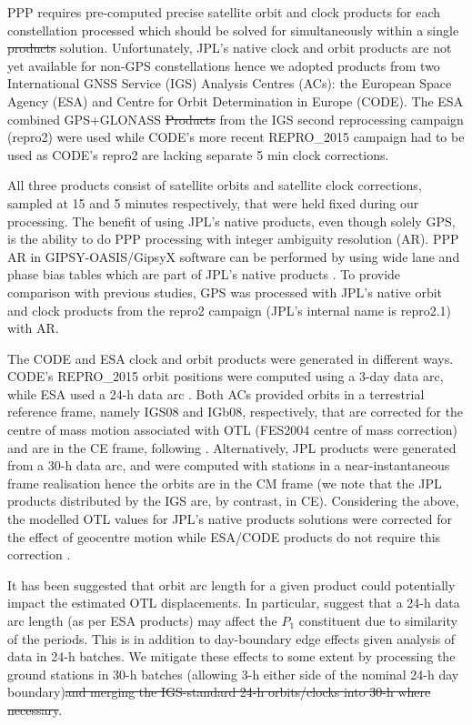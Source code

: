 \documentclass[se, manuscript]{copernicus}
\providecommand{\DIFadd}[1]{{\protect\color{blue}\uwave{#1}}} %
\providecommand{\DIFdel}[1]{{\protect\color{red}\sout{#1}}}                      %
\providecommand{\DIFaddbegin}{} %
\providecommand{\DIFaddend}{} %
\providecommand{\DIFdelbegin}{} %
\providecommand{\DIFdelend}{} %
\begin{document}
PPP requires pre-computed precise satellite orbit and clock products for each constellation processed which should be solved for simultaneously within a single \DIFdelbegin \DIFdel{products }\DIFdelend \DIFaddbegin \DIFadd{product's }\DIFaddend solution. Unfortunately, JPL’s native clock and orbit products are not yet available for non-GPS constellations hence we adopted products from two International GNSS Service (IGS) \citep{Johnston2017} Analysis Centres (ACs): the European Space Agency (ESA) and Centre for Orbit Determination in Europe (CODE). The ESA combined GPS+GLONASS \DIFdelbegin \DIFdel{Products }\DIFdelend \DIFaddbegin \DIFadd{products }\DIFaddend from the IGS second reprocessing campaign (repro2) were used \citep{Griffiths2019} while CODE’s more recent REPRO\_2015 campaign \citep{repro2015} had to be used as CODE’s repro2 are lacking separate 5 min clock corrections.

All three products consist of satellite orbits and satellite clock corrections, sampled at 15 and 5 minutes respectively, that were held fixed during our processing. The benefit of using JPL’s native products, even though solely GPS, is the ability to do PPP processing with integer ambiguity resolution (AR). PPP AR in GIPSY-OASIS/GipsyX software can be performed by using wide lane and phase bias tables which are part of JPL’s native products \citep{Bertiger2010}. To provide comparison with previous studies, GPS was processed with JPL’s native orbit and clock products from the repro2 campaign (JPL’s internal name is repro2.1) with AR.

The CODE and ESA clock and orbit products were generated in different ways. CODE’s REPRO\_2015 orbit positions were computed using a 3-day data arc, while ESA used a 24-h data arc \citep{Griffiths2019}. Both ACs provided orbits in a terrestrial reference frame, namely IGS08 and IGb08, respectively, that are corrected for the centre of mass motion associated with OTL (FES2004 centre of mass correction) and are in the CE frame, following \cite{Blewitt2003}. Alternatively, JPL products were generated from a 30-h data arc, and were computed with stations in a near-instantaneous frame realisation hence the orbits are in the CM frame (we note that the JPL products distributed by the IGS are, by contrast, in CE). Considering the above, the modelled OTL values for JPL’s native products solutions were corrected for the effect of geocentre motion while ESA/CODE products do not require this correction \citep{Kouba2009}.

It has been suggested that orbit arc length for a given product could potentially impact the estimated OTL displacements. In particular, \cite{Ito2011} suggest that a 24-h data arc length (as per ESA products) may affect the $P_1$ constituent due to similarity of the periods. This is in addition to day-boundary edge effects given analysis of data in 24-h batches. We mitigate these effects to some extent by processing the ground stations in 30-h batches (allowing 3-h either side of the nominal 24-h day boundary)\DIFdelbegin \DIFdel{and merging the IGS-standard 24-h orbits/clocks into 30-h where necessary}\DIFdelend .
\end{document}
